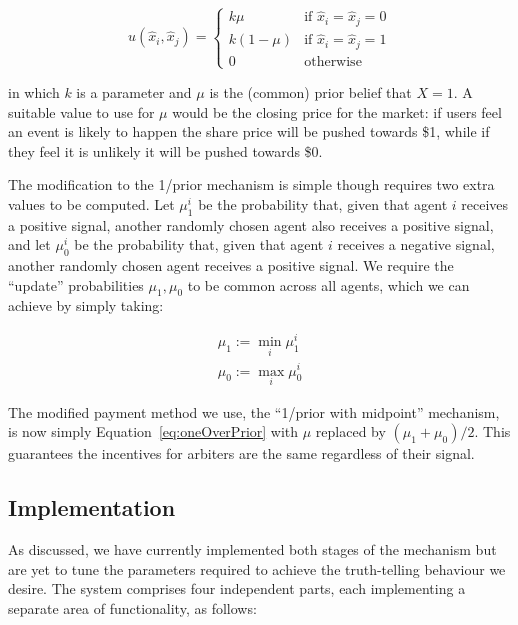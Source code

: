 \documentclass[10pt,a4paper]{article}
\theoremstyle{plain}
\theoremstyle{definition}
\begin{document}
\begin{equation}
	\label{eq:oneOverPrior}
	u(\hat{x}_i, \hat{x}_j) =
	\begin{cases}
		k \mu & \text{if } \hat{x}_i = \hat{x}_j = 0 \\
		k (1-\mu) & \text{if } \hat{x}_i = \hat{x}_j = 1 \\
		0 & \text{otherwise}
	\end{cases}
\end{equation}

in which $k$ is a parameter and $\mu$ is the (common) prior belief that $X=1$.
A suitable value to use for $\mu$ would be the closing price for the market: if
users feel an event is likely to happen the share price will be pushed towards
\$1, while if they feel it is unlikely it will be pushed towards \$0.

The modification to the 1/prior mechanism is simple though requires two extra
values to be computed. Let $\mu_1^i$ be the probability that, given that agent
$i$ receives a positive signal, another randomly chosen agent also receives a
positive signal, and let $\mu_0^i$ be the probability that, given that agent
$i$ receives a negative signal, another randomly chosen agent receives a
positive signal. We require the ``update'' probabilities $\mu_1, \mu_0$ to be
common across all agents, which we can achieve by simply taking:

\begin{equation}
	\begin{gathered}
		\mu_1 := \min_i \mu_1^i \\
		\mu_0 := \max_i \mu_0^i
	\end{gathered}
\end{equation}

The modified payment method we use, the ``1/prior with midpoint'' mechanism, is
now simply Equation~\ref{eq:oneOverPrior} with $\mu$ replaced by $(\mu_1 +
\mu_0)/2$. This guarantees the incentives for arbiters are the same regardless
of their signal.

\subsection{Implementation}

As discussed, we have currently implemented both stages of the mechanism but
are yet to tune the parameters required to achieve the truth-telling behaviour
we desire. The system comprises four independent parts, each implementing a
separate area of functionality, as follows:
\end{document}
